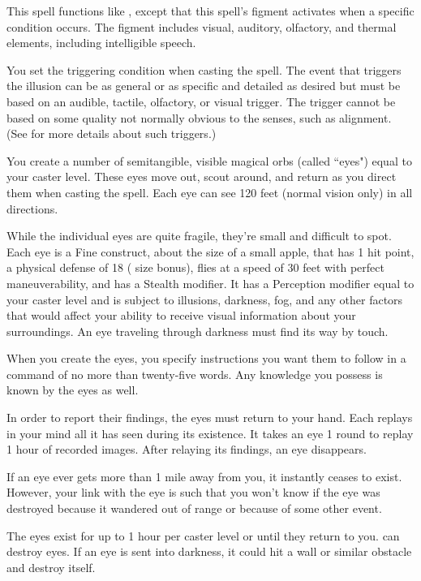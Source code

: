 \spelleffect This spell functions like , except that this spell's figment activates when a specific condition occurs. The figment includes visual, auditory, olfactory, and thermal elements, including intelligible speech.

You set the triggering condition when casting the spell. The event that triggers the illusion can be as general or as specific and detailed as desired but must be based on an audible, tactile, olfactory, or visual trigger. The trigger cannot be based on some quality not normally obvious to the senses, such as alignment. (See  for more details about such triggers.)

\spelleffect You create a number of semitangible, visible magical orbs (called ``eyes") equal to your caster level. These eyes move out, scout around, and return as you direct them when casting the spell. Each eye can see 120 feet (normal vision only) in all directions.
\par While the individual eyes are quite fragile, they're small and difficult to spot. Each eye is a Fine construct, about the size of a small apple, that has 1 hit point, a physical defense of 18 ( size bonus), flies at a speed of 30 feet with perfect maneuverability, and has a  Stealth modifier. It has a Perception modifier equal to your caster level and is subject to illusions, darkness, fog, and any other factors that would affect your ability to receive visual information about your surroundings. An eye traveling through darkness must find its way by touch.
\par When you create the eyes, you specify instructions you want them to follow in a command of no more than twenty-five words. Any knowledge you possess is known by the eyes as well.
\par In order to report their findings, the eyes must return to your hand. Each replays in your mind all it has seen during its existence. It takes an eye 1 round to replay 1 hour of recorded images. After relaying its findings, an eye disappears.
\par If an eye ever gets more than 1 mile away from you, it instantly ceases to exist. However, your link with the eye is such that you won't know if the eye was destroyed because it wandered out of range or because of some other event.
\par The eyes exist for up to 1 hour per caster level or until they return to you.
\spellnotes {} can destroy eyes. If an eye is sent into darkness, it could hit a wall or similar obstacle and destroy itself.

